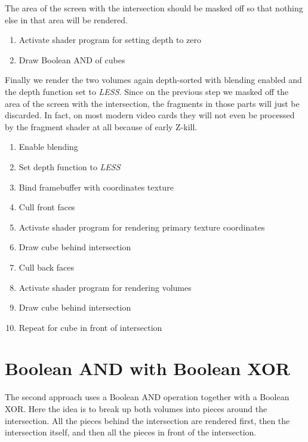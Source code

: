 \documentclass{report}
\begin{document}
The area of the screen with the intersection should be masked off so that
nothing else in that area will be rendered.

\begin{enumerate}
  \item Activate shader program for setting depth to zero
  \item Draw Boolean AND of cubes
\end{enumerate}

Finally we render the two volumes again depth-sorted with blending enabled and
the depth function set to \emph{LESS}.  Since on the previous step we masked off
the area of the screen with the intersection, the fragments in those parts will
just be discarded.  In fact, on most modern video cards they will not even be
processed by the fragment shader at all because of early Z-kill.

\begin{enumerate}
  \item Enable blending
  \item Set depth function to \emph{LESS}
  \item Bind framebuffer with coordinates texture
  \item Cull front faces
  \item Activate shader program for rendering primary texture coordinates
  \item Draw cube behind intersection
  \item Cull back faces
  \item Activate shader program for rendering volumes
  \item Draw cube behind intersection
  \item Repeat for cube in front of intersection
\end{enumerate}

\section{Boolean AND with Boolean XOR}

The second approach uses a Boolean AND operation together with a Boolean XOR.
Here the idea is to break up both volumes into pieces around the intersection.
All the pieces behind the intersection are rendered first, then the intersection
itself, and then all the pieces in front of the intersection.
\end{document}
